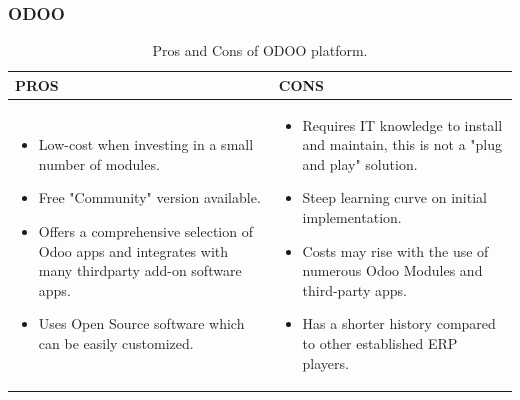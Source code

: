 \subsubsection{ODOO}
\begin{table}
    \centering
    \begin{tabular}{|p{}|p{}|}
        \hline
        \textbf{PROS} & \textbf{CONS}                                                               \\ \hline
        \begin{itemize}
            \item Low-cost when investing in a small number of modules.
            \item Free "Community" version available.
            \item Offers a comprehensive selection of Odoo apps and integrates with many thirdparty add-on software apps.
            \item Uses Open Source software which can be easily customized.
        \end{itemize}
                      &
        \begin{itemize}
            \item Requires IT knowledge to install and maintain, this is not a "plug and play" solution.
            \item Steep learning curve on initial implementation.
            \item Costs may rise with the use of numerous Odoo Modules and third-party apps.
            \item Has a shorter history compared to other established ERP players.
        \end{itemize} \\ \hline
    \end{tabular}
    \caption{Pros and Cons of ODOO platform.}
    \label{tab:odoo_pros_cons}
\end{table}

\newpage

